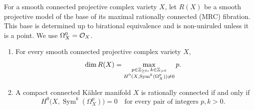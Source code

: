 For a smooth connected projective complex variety \(X\), let \(R(X)\)
be a smooth projective model of the base of its maximal rationally
connected (MRC) fibration. This base is determined up to birational
equivalence and is non-uniruled unless it is a point. We use
\(\Omega_X^0=\mathcal{O}_X\).

\begin{corollary}
\label{cor:pluriforms}
\begin{enumerate}[label=\textup{(\roman*)}]
\item For every smooth connected projective complex variety \(X\),
\[
 \dim R(X)=
 \max_{\substack{p\in\mathbb{Z}_{\geq0},\,k\in\mathbb{Z}_{>0}\\
 H^0(X,\operatorname{Sym}^k(\Omega_X^p))\ne0}} p.
\]
\item A compact connected K\"ahler manifold \(X\) is rationally
connected if and only if
\[
 H^0\bigl(X,\operatorname{Sym}^k(\Omega_X^p)\bigr)=0
 \quad\text{for every pair of integers }p,k>0.
\]
\end{enumerate}
\end{corollary}
